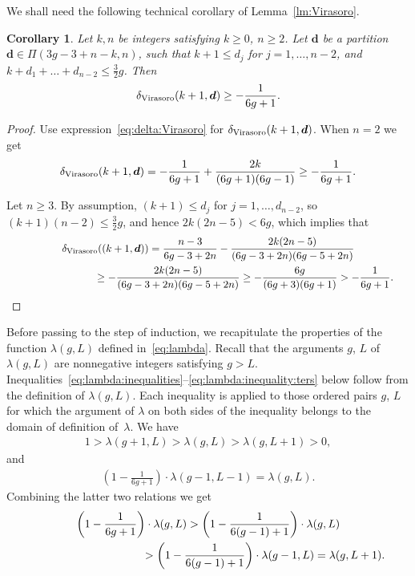 \documentclass[pdftex]{sigma}
\newtheorem{Corollary}[Theorem]{Corollary}
\theoremstyle{definition}
\begin{document}
We shall need the following technical corollary of Lemma~\ref{lm:Virasoro}.

\begin{Corollary}\label{cor:delat:Virasoro:bound}
Let $k,n$ be integers satisfying $k\ge 0$, $n\ge 2$.
Let $\boldsymbol{d}$ be a partition $\boldsymbol{d}\in\Pi(3g-3+n-k,n)$, such that
$k+1\le d_j$ for $j=1,\dots,n-2$,
and $k+d_1+\dots+d_{n-2}\le\frac{3}{2}g$.
Then
\begin{gather}\label{eq:delat:Virasoro:bound}
\delta_{\rm Virasoro}(k+1,\boldsymbol{d})\ge -\frac{1}{6g+1} .
\end{gather}
\end{Corollary}

\begin{proof}Use expression~\eqref{eq:delta:Virasoro} for
$\delta_{\rm Virasoro}(k+1,\boldsymbol{d})$.
When $n=2$ we get
\[
\delta_{\rm Virasoro}(k+1,\boldsymbol{d})=-\frac{1}{6g+1}+\frac{2k}{(6g+1)(6g-1)}\ge-\frac{1}{6g+1} .
\]

Let $n\ge 3$. By assumption, $(k+1)\le d_j$ for $j=1,\dots,d_{n-2}$, so $(k+1)(n-2)\le \frac{3}{2}g$, and hence $2k(2n-5)< 6g$, which implies that
\begin{gather*}
\delta_{\rm Virasoro}((k+1,\boldsymbol{d}))=\frac{n-3}{6g-3+2n}-\frac{2k(2n-5)}{(6g-3+2n)(6g-5+2n)}\\
\hphantom{\delta_{\rm Virasoro}((k+1,\boldsymbol{d}))}{} \ge -\frac{2k(2n-5)}{(6g-3+2n)(6g-5+2n)}
\ge -\frac{6g}{(6g+3)(6g+1)}>-\frac{1}{6g+1} .\!\!\!\tag*{\qed}
\end{gather*}\renewcommand{\qed}{}
\end{proof}

Before passing to the step of induction, we recapitulate the properties of the function $\lambda(g,L)$ defined in~\eqref{eq:lambda}.
Recall that the arguments $g$, $L$ of $\lambda(g,L)$ are nonnegative integers
satisfying $g>L$. Inequalities~\eqref{eq:lambda:inequalities}--\eqref{eq:lambda:inequality:ters}
below follow from the definition of $\lambda(g,L)$. Each inequality is
applied to those ordered pairs $g$, $L$ for which the argument of $\lambda$ on
both sides of the inequality belongs to the domain of definition of~$\lambda$. We have
\begin{gather}\label{eq:lambda:inequalities}
1>\lambda(g+1,L)>\lambda(g,L)>\lambda(g,L+1)>0 ,
\end{gather}
and
\begin{gather}\label{eq:lambda:inequality:bis}
\left(1-\frac{1}{6g+1}\right)
\cdot\lambda(g-1,L-1)=\lambda(g,L) .
\end{gather}
Combining the latter two relations we get
\begin{gather}
\left(1-\frac{1}{6g+1}\right)\cdot\lambda(g,L)>\left(1-\frac{1}{6(g-1)+1}\right)\cdot\lambda(g,L)\nonumber\\
\hphantom{\left(1-\frac{1}{6g+1}\right)\cdot\lambda(g,L)}{} >\left(1-\frac{1}{6(g-1)+1}\right)
\cdot\lambda(g-1,L) =\lambda(g,L+1) .\label{eq:lambda:inequality:ters}
\end{gather}
\end{document}
